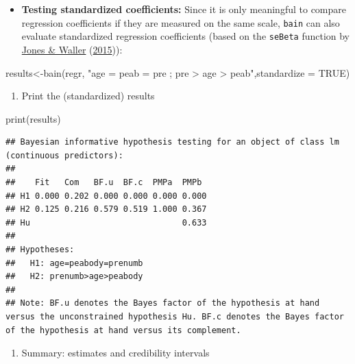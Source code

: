 \documentclass[
]{book}
\newenvironment{Shaded}{\begin{snugshade}}{\end{snugshade}}
\newcommand{\AttributeTok}[1]{\textcolor[rgb]{0.77,0.63,0.00}{#1}}
\newcommand{\ConstantTok}[1]{\textcolor[rgb]{0.00,0.00,0.00}{#1}}
\newcommand{\FunctionTok}[1]{\textcolor[rgb]{0.00,0.00,0.00}{#1}}
\newcommand{\NormalTok}[1]{#1}
\newcommand{\OtherTok}[1]{\textcolor[rgb]{0.56,0.35,0.01}{#1}}
\newcommand{\StringTok}[1]{\textcolor[rgb]{0.31,0.60,0.02}{#1}}
\providecommand{\tightlist}{%
  \setlength{\itemsep}{0pt}\setlength{\parskip}{0pt}}
\begin{document}
\begin{itemize}
\tightlist
\item
  \textbf{Testing standardized coefficients:} Since it is only meaningful to compare regression coefficients if they are measured on the same scale, \texttt{bain} can also evaluate standardized regression coefficients (based on the \texttt{seBeta} function by \protect\hyperlink{ref-jones2015normal}{Jones \& Waller} (\protect\hyperlink{ref-jones2015normal}{2015})):
\end{itemize}

\begin{Shaded}
\begin{Highlighting}[]
\NormalTok{results}\OtherTok{\textless{}{-}}\FunctionTok{bain}\NormalTok{(regr, }\StringTok{"age = peab = pre ; pre \textgreater{} age \textgreater{} peab"}\NormalTok{,}\AttributeTok{standardize =} \ConstantTok{TRUE}\NormalTok{)}
\end{Highlighting}
\end{Shaded}

\begin{enumerate}
\def\labelenumi{\arabic{enumi})}
\setcounter{enumi}{3}
\tightlist
\item
  Print the (standardized) results
\end{enumerate}

\begin{Shaded}
\begin{Highlighting}[]
\FunctionTok{print}\NormalTok{(results)}
\end{Highlighting}
\end{Shaded}

\begin{verbatim}
## Bayesian informative hypothesis testing for an object of class lm (continuous predictors):
## 
##    Fit   Com   BF.u  BF.c  PMPa  PMPb 
## H1 0.000 0.202 0.000 0.000 0.000 0.000
## H2 0.125 0.216 0.579 0.519 1.000 0.367
## Hu                               0.633
## 
## Hypotheses:
##   H1: age=peabody=prenumb
##   H2: prenumb>age>peabody
## 
## Note: BF.u denotes the Bayes factor of the hypothesis at hand versus the unconstrained hypothesis Hu. BF.c denotes the Bayes factor of the hypothesis at hand versus its complement.
\end{verbatim}

\begin{enumerate}
\def\labelenumi{\arabic{enumi})}
\setcounter{enumi}{4}
\tightlist
\item
  Summary: estimates and credibility intervals
\end{enumerate}
\end{document}
